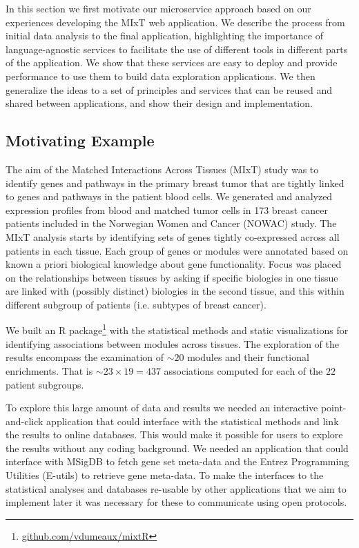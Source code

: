 In this section we first motivate our microservice approach based on our
experiences developing the MIxT web application. We describe the process from
initial data analysis to the final application, highlighting the importance of
language-agnostic services to facilitate the use of different tools in different
parts of the application. We show that these services are easy to deploy and
provide performance to use them to build data exploration applications.
We then generalize the ideas to a set of principles and services that can be
reused and shared between applications, and show their design and
implementation. 

\subsection*{Motivating Example} 
The aim of the Matched Interactions Across Tissues (MIxT) study was to identify
genes and pathways in the primary breast tumor that are tightly linked to genes
and pathways in the patient blood cells.\cite{vanessa} We generated and analyzed expression
profiles from blood and matched tumor cells in 173 breast cancer patients
included in the Norwegian Women and Cancer (NOWAC) study.
The MIxT analysis starts by identifying sets of genes tightly co-expressed
across all patients in each tissue. Each group of genes or modules were
annotated based on known a priori biological knowledge about gene functionality.
Focus was placed on the relationships between tissues by asking if specific
biologies in one tissue are linked with (possibly distinct) biologies in the
second tissue, and this within different subgroup of patients (i.e. subtypes of
breast cancer).

We built an R package\footnote{\url{github.com/vdumeaux/mixtR}} with the
statistical methods and static visualizations for identifying associations
between modules across tissues. The exploration of the results encompass the
examination  of $\sim20$ modules and their functional enrichments. That is
$\sim23\times19=437$ associations computed for each of the $22$ patient
subgroups. 

To explore this large amount of data and results we needed an interactive
point-and-click application that could interface with the statistical methods
and link the results to online databases. This would make it possible for users
to explore the results without any coding background. We needed an application
that could interface with MSigDB to fetch gene set meta-data and the Entrez
Programming Utilities (E-utils) to retrieve gene meta-data. To make the
interfaces to the statistical analyses and databases re-usable by other
applications that we aim to implement later it was necessary for these to
communicate using open protocols. 

